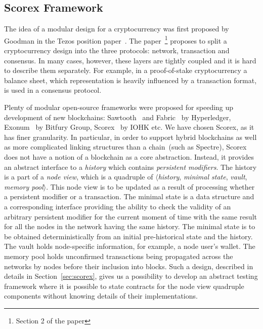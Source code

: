 
\subsection{Scorex Framework}

The idea of a modular design for a cryptocurrency was first proposed by Goodman in the Tezos position paper~\cite{tezosPosition}. The paper~\footnote{Section 2 of the paper} proposes to split a cryptocurrency design into the three protocols: network, transaction and consensus. In many cases, however, these layers are tightly coupled and it is hard to describe them separately. For example, in a proof-of-stake cryptocurrency a balance sheet, which representation is heavily influenced by a transaction format, is used in a consensus protocol. 

Plenty of modular open-source frameworks were proposed for speeding up development of new blockchains: Sawtooth~\cite{sawtooth} and Fabric~\cite{fabric} by Hyperledger, Exonum~\cite{exonum} by Bitfury Group, Scorex~\cite{scorex} by IOHK etc. We have chosen Scorex, as it has finer granularity. In particular, in order to support hybrid blockchains as well as more complicated linking structures than a chain~(such as Spectre\cite{spectre}), Scorex does not have a notion of a blockchain as a core abstraction. Instead, it provides an abstract interface to a \textit{history} which contains \textit{persistent modifiers}. The history is a part of a \textit{node view}, which is a quadruple of $\langle$\textit{history}, \textit{minimal state}, \textit{vault}, \textit{memory pool}$\rangle$. This node view is to be updated as a result of processing whether a persistent modifier or a transaction. The minimal state is a data structure and a corresponding interface providing the ability to check the validity of an arbitrary persistent modifier for the current moment of time with the same result for all the nodes in the network having the same history. The minimal state is to be obtained deterministically from an initial pre-historical state and the history. The vault holds node-specific information, for example, a node user's wallet. The memory pool holds unconfirmed transactions being propagated across the networks by nodes before their inclusion into blocks. Such a design, described in details in Section~\ref{sec:scorex}, gives us a possibility to develop an abstract testing framework where it is possible to state contracts for the node view quadruple components without knowing details of their implementations.